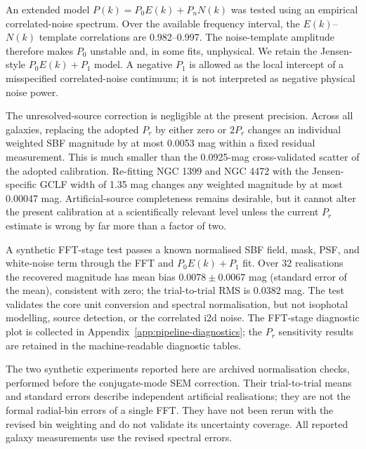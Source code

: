 \documentclass[nodoi,nocopyright]{pas}
\begin{document}
An extended model $P(k)=P_0E(k)+P_nN(k)$ was tested using an empirical
correlated-noise spectrum. Over the available frequency interval, the
$E(k)$--$N(k)$ template correlations are 0.982--0.997. The noise-template
amplitude therefore makes $P_0$ unstable and, in some fits, unphysical. We
retain the Jensen-style $P_0E(k)+P_1$ model. A negative $P_1$ is allowed as the local
intercept of a misspecified correlated-noise continuum; it is not interpreted
as negative physical noise power.

The unresolved-source correction is negligible at the present precision.
Across all galaxies, replacing the adopted $P_r$ by either zero or $2P_r$
changes an individual weighted SBF magnitude by at most 0.0053 mag within a
fixed residual measurement. This is much smaller than the 0.0925-mag
cross-validated scatter of the adopted calibration. Re-fitting NGC 1399 and NGC 4472 with the
Jensen-specific GCLF width of 1.35 mag changes any weighted magnitude by at
most 0.00047 mag. Artificial-source completeness remains desirable, but it
cannot alter the present calibration at a scientifically relevant level
unless the current $P_r$ estimate is wrong by far more than a factor of two.

A synthetic FFT-stage test passes a known normalised SBF field, mask, PSF,
and white-noise term through the FFT and $P_0E(k)+P_1$ fit. Over 32
realisations the recovered magnitude has mean bias
$0.0078\pm0.0067$ mag (standard error of the mean), consistent with zero; the
trial-to-trial RMS is 0.0382 mag. The test validates the core unit conversion
and spectral normalisation, but not isophotal modelling, source detection, or
the correlated i2d noise. The FFT-stage diagnostic plot is
collected in Appendix~\ref{app:pipeline-diagnostics}; the $P_r$ sensitivity
results are retained in the machine-readable diagnostic tables.

The two synthetic experiments reported here are archived normalisation
checks, performed before the conjugate-mode SEM correction. Their
trial-to-trial means and standard errors describe independent artificial
realisations; they are not the formal radial-bin errors of a single FFT.
They have not been rerun with the revised bin weighting and do not validate
its uncertainty coverage. All reported galaxy measurements use the revised
spectral errors.
\end{document}
